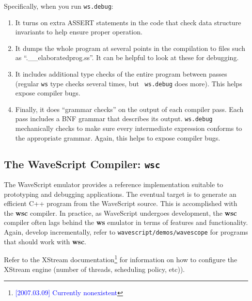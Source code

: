\documentclass[twocolumn]{report}
\newcommand{\rednote}[1]{{\textcolor{blue}{#1}}}
\begin{document}
Specifically, when you run {\tt ws.debug}:

\begin{enumerate}
\item It turns on extra ASSERT statements in the code that check data
structure invariants to help ensure proper operation.

\item It dumps the whole program at several points in the
  compilation to files such as ``.\_\_elaboratedprog.ss''.  It can be
  helpful to look at these for debugging.

\item It includes additional type checks of the entire program between
  passes (regular {\tt ws} type checks several times, but {\tt
  ws.debug} does more).  This helps expose compiler bugs.

\item Finally, it does ``grammar checks'' on the output of each compiler
  pass. Each pass includes a BNF grammar that describes its output.
  {\tt ws.debug} mechanically checks to make sure every intermediate
  expression conforms to the appropriate grammar.  Again, this helps
  to expose compiler bugs.
\end{enumerate}


\subsection{The WaveScript Compiler: {\tt \bf wsc}}

The WaveScript emulator provides a reference implementation suitable
to prototyping and debugging applications.  The eventual target is to
generate an efficient C++ program from the WaveScript source.  This is
accomplished with the {\bf wsc} compiler.  In practice, as WaveScript
undergoes development, the {\bf wsc} compiler often lags behind the {\bf ws}
emulator in terms of features and functionality.  Again, develop
incrementally, refer to {\tt wavescript/demos/wavescope} for programs that
should work with {\bf wsc}.

Refer to the XStream documentation\footnote{\rednote{[2007.03.09] Currently nonexistent}} 
for information on how to configure the XStream engine
(number of threads, scheduling policy, etc)).
\end{document}

